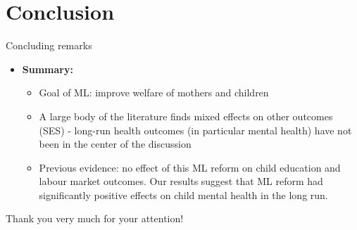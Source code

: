 \documentclass[aspectratio=169,handout]{beamer} %
\begin{document}
\section{Conclusion}
\begin{frame}{Concluding remarks}
\begin{itemize}
\item \textbf{Summary:}
\begin{itemize}
\item Goal of ML: improve welfare of mothers and children
\item A large body of the literature finds mixed effects on other outcomes (SES) - long-run health outcomes (in particular mental health) have not been in the center of the discussion

\item Previous evidence: no effect of this ML reform on child education and labour market outcomes. \newline
Our results suggest that ML reform had significantly positive effects on child mental health in the long run.


\end{itemize}
\end{itemize}



\end{frame}




\begin{frame}
\begin{center}
Thank you very much for your attention!
\end{center}




\end{frame}
\end{document}
